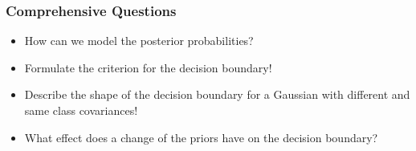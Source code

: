 \begin{frame}
  \frametitle{Comprehensive Questions}
  
  \begin{itemize}
    \item How can we model the posterior probabilities? \\[1cm] \pause
    \item Formulate the criterion for the decision boundary! \\[1cm] \pause
    \item Describe the shape of the decision boundary for a Gaussian with different and same class covariances! \\[1cm] \pause
    \item What effect does a change of the priors have on the decision boundary?
  \end{itemize}
\end{frame}



